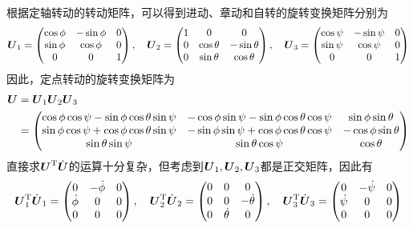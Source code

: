 根据定轴转动的转动矩阵，可以得到进动、章动和自转的旋转变换矩阵分别为
\begin{equation*}
	\boldsymbol{U}_1 = \begin{pmatrix} \cos \phi & -\sin \phi & 0 \\ \sin \phi & \cos \phi & 0 \\ 0 & 0 & 1 \end{pmatrix},\quad \boldsymbol{U}_2 = \begin{pmatrix} 1 & 0 & 0 \\ 0 & \cos \theta & -\sin \theta \\ 0 & \sin \theta & \cos \theta \end{pmatrix},\quad \boldsymbol{U}_3 = \begin{pmatrix} \cos \psi & -\sin \psi & 0 \\ \sin \psi & \cos \psi & 0 \\ 0 & 0 & 1 \end{pmatrix}
\end{equation*}
因此，定点转动的旋转变换矩阵为
\begin{align}
	\boldsymbol{U} & = \boldsymbol{U}_1 \boldsymbol{U}_2 \boldsymbol{U}_3 \nonumber \\
	& = \begin{pmatrix}
		\cos \phi \cos \psi - \sin \phi \cos \theta \sin \psi & -\cos \phi \sin \psi - \sin \phi \cos \theta \cos \psi & \sin \phi \sin \theta \\
		\sin \phi \cos \psi + \cos \phi \cos \theta \sin \psi & -\sin \phi \sin \psi + \cos \phi \cos \theta \cos \psi & -\cos \phi \sin \theta \\
		\sin \theta \sin \psi & \sin \theta \cos \psi & \cos \theta
	\end{pmatrix}
	\label{chapter6:定点转动的变换矩阵}
\end{align}
直接求$\boldsymbol{U}^{\mathrm{T}} \dot{\boldsymbol{U}}$的运算十分复杂，但考虑到$\boldsymbol{U}_1,\boldsymbol{U}_2,\boldsymbol{U}_3$都是正交矩阵，因此有
\begin{equation*}
	\boldsymbol{U}_1^{\mathrm{T}} \dot{\boldsymbol{U}}_1 = \begin{pmatrix} 0 & -\dot{\phi} & 0 \\ \dot{\phi} & 0 & 0 \\ 0 & 0 & 0 \end{pmatrix},\quad \boldsymbol{U}_2^{\mathrm{T}} \dot{\boldsymbol{U}}_2 = \begin{pmatrix} 0 & 0 & 0 \\ 0 & 0 & -\dot{\theta} \\ 0 & \dot{\theta} & 0 \end{pmatrix},\quad \boldsymbol{U}_3^{\mathrm{T}} \dot{\boldsymbol{U}}_3 = \begin{pmatrix} 0 & -\dot{\psi} & 0 \\ \dot{\psi} & 0 & 0 \\ 0 & 0 & 0 \end{pmatrix}
\end{equation*}
